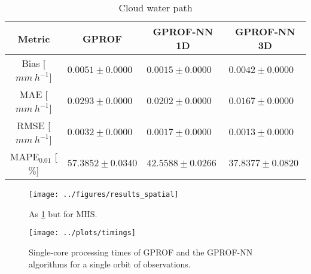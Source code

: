\documentclass[a4paper,11pt,bibtotoc]{scrartcl}
\begin{document}
\begin{table}[hbpt!]
\begin{subtable}{\textwidth} 
 \caption{Cloud water path} 
\begin{tabular}{|c||p{3.5cm}|p{3.5cm}|p{3.5cm}|}
\hline
Metric &
\multicolumn{1}{|c}{GPROF} &
\multicolumn{1}{|c}{GPROF-NN 1D} &
\multicolumn{1}{|c|}{GPROF-NN 3D} \\
\hline\hline
Bias \hfill [$\unit{mm\ h^{-1}}$] & \hfill $  0.0051 \pm 0.0000$ &\hfill $  0.0015 \pm 0.0000$ &\hfill $  0.0042 \pm 0.0000$ \\
MAE \hfill [$\unit{mm\ h^{-1}}$] & \hfill $  0.0293 \pm 0.0000$ &\hfill $  0.0202 \pm 0.0000$ &\hfill $  0.0167 \pm 0.0000$ \\
RMSE \hfill [$\unit{mm\ h^{-1}}$] & \hfill $  0.0032 \pm 0.0000$ &\hfill $  0.0017 \pm 0.0000$ &\hfill $  0.0013 \pm 0.0000$ \\
MAPE$_{0.01}$ \hfill [$\unit{\%}$] & \hfill $ 57.3852 \pm 0.0340$ &\hfill $ 42.5588 \pm 0.0266$ &\hfill $ 37.8377 \pm 0.0820$ \\
\hline
\end{tabular}
\end{subtable}

\end{table}

\clearpage

\begin{figure}[hbpt]
  \centering
  \texttt{[image: ../figures/results\_spatial]}
  \caption{
    As \ref{fig:results_spatial} but for MHS.
  }
  \label{fig:results_spatial}
\end{figure}


\begin{figure}[hbpt]
  \centering
  \texttt{[image: ../plots/timings]}
  \caption{
    Single-core processing times of GPROF and the GPROF-NN algorithms for a
    single orbit of observations.
    }
  \label{fig:timings}
\end{figure}

\end{document}
